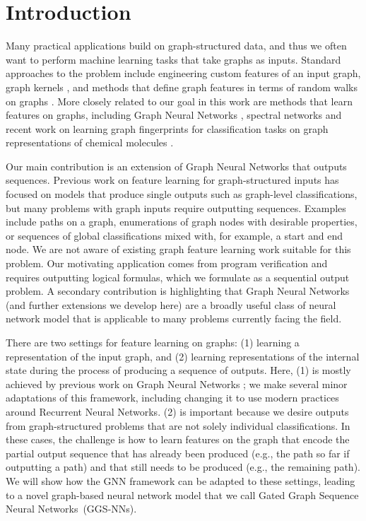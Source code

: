\documentclass{article} %
\newcommand{\OurMethod}{Gated Graph Sequence Neural Network}
\newcommand{\OurMethods}{\OurMethod s}
\newcommand{\OurMethodShort}{GGS-NN}
\newcommand{\OurMethodShorts}{\OurMethodShort s}
\begin{document}

\section{Introduction}

Many practical applications build on graph-structured data, and thus we often
want to perform machine learning tasks that take graphs as inputs. Standard approaches
to the problem include engineering custom features of an input graph,
graph kernels
\citep{kashima2003marginalized,shervashidze2011weisfeiler}, and
methods that define graph features in terms of random walks on graphs
\citep{perozzi2014deepwalk}.  More closely related to our goal in this
work are methods that learn features on graphs, including Graph Neural
Networks \citep{gori2005new,scarselli2009graph}, spectral networks
\citep{bruna2013spectral} and recent work on learning graph
fingerprints for classification tasks on graph representations of
chemical molecules \citep{duvenaud2015convolutional}.


Our main contribution is an extension of Graph Neural Networks that outputs
sequences. Previous work
on feature learning for graph-structured inputs has focused on models
that produce single outputs such as graph-level classifications, but
many problems with graph inputs require outputting sequences.
Examples include paths on a graph, enumerations of graph nodes with
desirable properties, or sequences of global classifications mixed
with, for example, a start and end node.  We are not aware of existing
graph feature learning work suitable for this problem. Our motivating
application comes from program verification and requires outputting
logical formulas, which we formulate as a sequential output problem.
A secondary contribution is highlighting that
Graph Neural Networks (and further extensions we develop here) are a
broadly useful class of neural network model that is applicable to many problems
currently facing the field.


There are two settings for feature learning on graphs: (1) learning a
representation of the input graph, and (2) learning representations of
the internal state during the process of producing a sequence of outputs.
Here, (1) is mostly achieved by previous work on Graph Neural Networks
\citep{scarselli2009graph}; we make several minor adaptations of
this framework, including changing it to use modern practices around
Recurrent Neural Networks. (2) is important because we desire outputs
from graph-structured problems that are not solely individual
classifications.  In these cases, the challenge is how to learn
features on the graph that encode the partial output sequence that has
already been produced (e.g., the path so far if outputting a path) and
that still needs to be produced (e.g., the remaining path). We will
show how the GNN framework can be adapted to these settings, leading
to a novel graph-based neural network model that we call
\OurMethods~(\OurMethodShorts).
\end{document}
